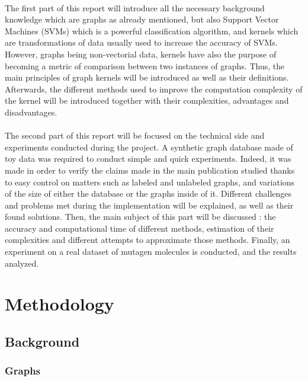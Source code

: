 \documentclass{article}
\theoremstyle{definition}
\begin{document}
 \paragraph{}The first part of this report will introduce all the necessary background knowledge which are graphs as already mentioned, but also Support Vector Machines (SVMs) which is a powerful classification algorithm, and kernels which are transformations of data usually used to increase the accuracy of SVMs. However, graphs being non-vectorial data, kernels have also the purpose of becoming a metric of comparison between two instances of graphs. Thus, the main principles of graph kernels will be introduced as well as their definitions. Afterwards, the different methods used to improve the computation complexity of the kernel will be introduced together with their complexities, advantages and disadvantages.
\paragraph{}The second part of this report will be focused on the technical side and experiments conducted during the project. A synthetic graph database made of toy data was required to conduct simple and quick experiments. Indeed, it was made in order to verify the claims made in the main publication studied thanks to easy control on matters such as labeled and unlabeled graphs, and variations of the size of either the database or the graphs inside of it. Different challenges and problems met during the implementation will be explained, as well as their found solutions. Then, the main subject of this part will be discussed : the accuracy and computational time of different methods, estimation of their complexities and different attempts to approximate those methods. Finally, an experiment on a real dataset of mutagen molecules is conducted, and the results analyzed.

\newpage
\section{Methodology}
\subsection{Background}
\subsubsection{Graphs}
\end{document}
